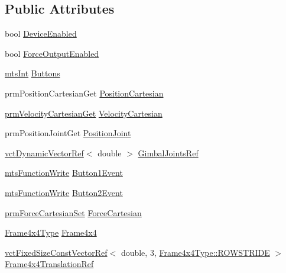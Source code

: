 \subsection*{Public Attributes}
\begin{DoxyCompactItemize}
\item 
bool \hyperlink{structmts_sensable_h_d_1_1_device_data_a7c583a0171cbf2cffd0098c25496fd44}{Device\+Enabled}
\item 
bool \hyperlink{structmts_sensable_h_d_1_1_device_data_aa1a01c751b9d1de7d9e8b36bd6b734a0}{Force\+Output\+Enabled}
\item 
\hyperlink{mts_generic_object_proxy_8h_a24374d6f6591267740de73ba87c08d4e}{mts\+Int} \hyperlink{structmts_sensable_h_d_1_1_device_data_ab66d3995932ca9253743a231dea8fd39}{Buttons}
\item 
prm\+Position\+Cartesian\+Get \hyperlink{structmts_sensable_h_d_1_1_device_data_a4d969029290b854322a3c4f4f94e37c8}{Position\+Cartesian}
\item 
\hyperlink{classprm_velocity_cartesian_get}{prm\+Velocity\+Cartesian\+Get} \hyperlink{structmts_sensable_h_d_1_1_device_data_a2878f540b39f0f5bce4ad8e82f446fdf}{Velocity\+Cartesian}
\item 
prm\+Position\+Joint\+Get \hyperlink{structmts_sensable_h_d_1_1_device_data_a3c3a873384119db3e76de8b622240193}{Position\+Joint}
\item 
\hyperlink{classvct_dynamic_vector_ref}{vct\+Dynamic\+Vector\+Ref}$<$ double $>$ \hyperlink{structmts_sensable_h_d_1_1_device_data_ab0dc17f798dd5a4509031b4f12f42b87}{Gimbal\+Joints\+Ref}
\item 
\hyperlink{classmts_function_write}{mts\+Function\+Write} \hyperlink{structmts_sensable_h_d_1_1_device_data_a9d5eb167f38e79ef41f510177b19a292}{Button1\+Event}
\item 
\hyperlink{classmts_function_write}{mts\+Function\+Write} \hyperlink{structmts_sensable_h_d_1_1_device_data_a2bebe1f4ce8c48a720dc982a42eee385}{Button2\+Event}
\item 
\hyperlink{classprm_force_cartesian_set}{prm\+Force\+Cartesian\+Set} \hyperlink{structmts_sensable_h_d_1_1_device_data_a78fa11b960c040001da25a38887327be}{Force\+Cartesian}
\item 
\hyperlink{structmts_sensable_h_d_1_1_device_data_a46ac85be135ad15c04fbe2b06a689781}{Frame4x4\+Type} \hyperlink{structmts_sensable_h_d_1_1_device_data_acfdea4e1ea34ce4887c3ccee27ecd437}{Frame4x4}
\item 
\hyperlink{classvct_fixed_size_const_vector_ref}{vct\+Fixed\+Size\+Const\+Vector\+Ref}$<$ double, 3, \hyperlink{classvct_fixed_size_matrix_base_a7ca4cc289d4bd697476f2d37e82e9a38a6c561939f5de9c5e815b889df7662117}{Frame4x4\+Type\+::\+R\+O\+W\+S\+T\+R\+I\+D\+E} $>$ \hyperlink{structmts_sensable_h_d_1_1_device_data_aee2d3dc0deb12ad500c4c57a26106f1b}{Frame4x4\+Translation\+Ref}

\end{DoxyCompactItemize}

